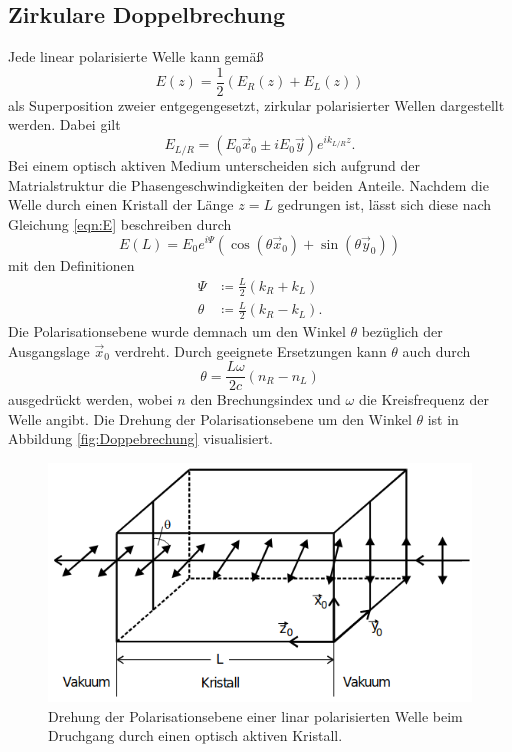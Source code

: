 \subsection{Zirkulare Doppelbrechung}
\label{sec:Doppebrechung}
Jede linear polarisierte Welle kann gemäß
\begin{equation}
    E(z)=\frac{1}{2}(E_R(z)+E_L(z))
    \label{eqn:E}   
\end{equation}
als Superposition zweier entgegengesetzt, zirkular polarisierter Wellen dargestellt werden. Dabei gilt 
\begin{equation*}
    E_{L/R}=(E_0\vec{x}_0\pm iE_0\vec{y})e^{ik_{L/R}z} .
\end{equation*}
Bei einem optisch aktiven Medium unterscheiden sich aufgrund der Matrialstruktur die Phasengeschwindigkeiten der beiden Anteile. 
Nachdem die Welle durch einen Kristall der Länge $z=L$ gedrungen ist, lässt sich diese nach Gleichung \ref{eqn:E} beschreiben durch
\begin{equation*}
    E(L)=E_0e^{i\Psi}(\cos{(\theta\vec{x}_0)}+\sin{(\theta\vec{y}_0)})
\end{equation*}
mit den Definitionen
\begin{align*}
    \Psi  &\coloneqq \frac{L}{2}(k_R+k_L)\\
    \theta&\coloneqq \frac{L}{2}(k_R-k_L) .
\end{align*}
Die Polarisationsebene wurde demnach um den Winkel $\theta$ bezüglich der Ausgangslage $\vec{x}_0$ verdreht. Durch geeignete 
Ersetzungen kann $\theta$ auch durch 
\begin{equation*}
    \theta=\frac{L\omega}{2c}(n_R-n_L)
\end{equation*}
ausgedrückt werden, wobei $n$ den Brechungsindex und $\omega$ die Kreisfrequenz der Welle angibt. Die Drehung der Polarisationsebene
um den Winkel $\theta$ ist in Abbildung \ref{fig:Doppebrechung} visualisiert.
\begin{figure}[H]
    \centering
    \includegraphics[scale=0.6]{pictures/Doppelbrechung.png}
    \caption{Drehung der Polarisationsebene einer linar polarisierten Welle beim Druchgang durch einen optisch aktiven Kristall. \cite{Anhang}}
\end{figure}
